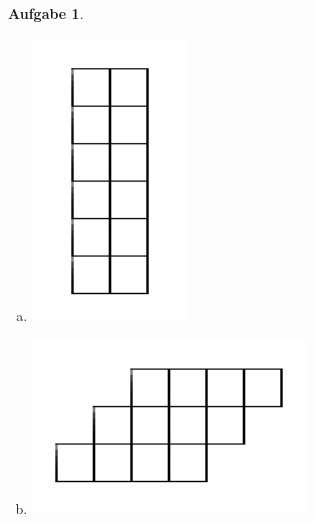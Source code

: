 \documentclass{article}
\newtheorem{aufgabe}{Aufgabe}[section]
\begin{document}
\begin{aufgabe}
\begin{paracol}{2}
\begin{enumerate}[(a)]
\item
\begin{minipage}{\linewidth}
\centering
\includegraphics[width=0.5\linewidth]{pictures/quadrate6x2.png}
\end{minipage}

\item
\begin{minipage}{\linewidth}
\centering
\includegraphics[width=0.9\linewidth]{pictures/quadrate3x4-schraeg.png}
\end{minipage}


\end{enumerate}
\end{paracol}
\end{aufgabe}
\end{document}
